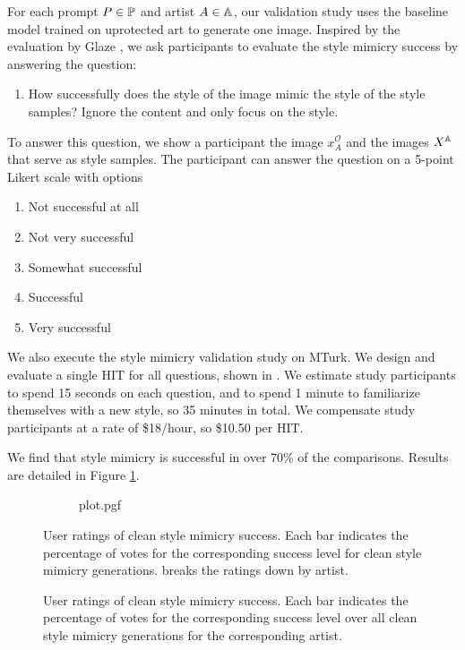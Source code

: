 \documentclass{article}
\newcommand{\orig}[0]{\mathcal{O}}
\begin{document}
For each prompt $P \in {\mathbb{P}}$ and artist $A \in {\mathbb{A}}$, our validation study uses the baseline model trained on uprotected art to generate one image. Inspired by the evaluation by Glaze \citep{glaze}, we ask participants to evaluate the style mimicry success by answering the question:
\begin{enumerate}
  \item[] How successfully does the style of the image mimic the style of the style samples? Ignore the content and only focus on the style.
\end{enumerate}
To answer this question, we show a participant the image $x_A^\orig{}$ and the images $X^{{\mathbb{A}}}$ that serve as style samples.
The participant can answer the question on a 5-point Likert scale with options  
\begin{enumerate}
    \item Not successful at all
    \item Not very successful
    \item Somewhat successful
    \item Successful
    \item Very successful
\end{enumerate}

We also execute the style mimicry validation study on MTurk. We design and evaluate a single HIT for all questions, shown in . We estimate study participants to spend 15 seconds on each question, and to spend 1 minute to familiarize themselves with a new style, so 35 minutes in total.
We compensate study participants at a rate of \$18/hour, so \$10.50 per HIT.

We find that style mimicry is successful in over 70\% of the comparisons. Results are detailed in Figure \ref{fig:mimicrysucces}.

\begin{figure}[t]
    \centering
    \begin{subfigure}[t]{\textwidth}{{plot.pgf}}
    \end{subfigure}
    \caption{User ratings of clean style mimicry success. Each bar indicates the percentage of votes for the corresponding success level for clean style mimicry generations.  breaks the ratings down by artist.}
    \label{fig:mimicrysucces}
\end{figure}

\begin{figure}[t]
    \centering
    \hspace*{-1.5cm}
    \caption{User ratings of clean style mimicry success. Each bar indicates the percentage of votes for the corresponding success level over all clean style mimicry generations for the corresponding artist.}
    \label{fig:mimicrysuccesperartist}
\end{figure}
\end{document}

